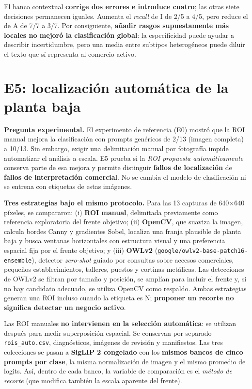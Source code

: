 \documentclass[10pt,a4paper]{article}
\begin{document}
El banco contextual \textbf{corrige dos errores e introduce cuatro}; las otras siete decisiones permanecen iguales. Aumenta el \emph{recall} de I de 2/5 a 4/5, pero reduce el de A de 7/7 a 3/7. Por consiguiente, \textbf{añadir rasgos supuestamente más locales no mejoró la clasificación global}: la especificidad puede ayudar a describir incertidumbre, pero una media entre subtipos heterogéneos puede diluir el texto que sí representa al comercio activo.


\section{E5: localización automática de la planta baja}

\textbf{Pregunta experimental.} El experimento de referencia (E0) mostró que la ROI manual mejora la clasificación con prompts genéricos de 2/13 (imagen completa) a 10/13. Sin embargo, exigir una delimitación manual por fotografía impide automatizar el análisis a escala. E5 prueba si la \emph{ROI propuesta automáticamente} conserva parte de esa mejora y permite distinguir \textbf{fallos de localización} de \textbf{fallos de interpretación comercial}. No se cambia el modelo de clasificación ni se entrena con etiquetas de estas imágenes.

\textbf{Tres estrategias bajo el mismo protocolo.} Para las 13 capturas de 640$\times$640 píxeles, se compararon: (i) \textbf{ROI manual}, delimitada previamente como referencia exploratoria del frente objetivo; (ii) \textbf{OpenCV}, que suaviza la imagen, calcula bordes Canny y gradientes Sobel, localiza una franja plausible de planta baja y busca ventanas horizontales con estructura visual y una preferencia espacial fija por el frente objetivo; y (iii) \textbf{OWLv2} (\texttt{google/owlv2-base-patch16-ensemble}), detector \emph{zero-shot} guiado por consultas sobre accesos comerciales, pequeños establecimientos, talleres, puestos y cortinas metálicas. Las detecciones de OWLv2 se filtran por tamaño y posición, se amplían para incluir el frente y, si no hay candidato adecuado, se utiliza OpenCV como respaldo. Ambas estrategias generan una ROI incluso cuando la etiqueta es N; \textbf{proponer un recorte no significa detectar un negocio activo}.

Las ROI manuales \textbf{no intervienen en la selección automática}: se utilizan después para medir superposición espacial. Se conservan por separado \texttt{rois\_auto.csv}, diagnósticos, imágenes de revisión y manifiestos. Las tres colecciones se pasan a \textbf{SigLIP 2 congelado} con los \textbf{mismos bancos de cinco prompts por clase}, la misma normalización de imagen y el mismo promedio de logits. Así, dentro de cada banco, la variable de comparación es el \emph{método de recorte} (que modifica también la escala aparente del frente).
\end{document}
